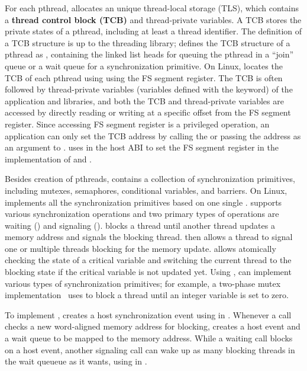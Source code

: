 For each pthread, \libpthread{} allocates an unique thread-local storage (TLS), which contains a {\bf thread control block (TCB)} and thread-private variables.
A TCB stores the private states of a pthread, including at least a thread identifier.
The definition of a TCB structure is up to the threading library;
\libpthread{} defines the TCB structure of a pthread as ,
containing the linked list heads for queuing the pthread
in a ``join'' queue or a wait queue for a synchronization primitive.
On \graphenearch{} Linux, \libpthread{}
locates the TCB of each pthread using using the FS segment register.
The TCB is often
followed by thread-private variables (variables defined with the  keyword) of the application
and libraries,
and both the TCB and thread-private variables
are accessed by directly reading or writing at a specific offset from the FS segment register.
Since accessing FS segment register is a privileged operation,
an application can only set the TCB address
by calling the  \linuxapi{} or passing the address as an argument to .
\thelibos{} uses  in the host ABI
to set the FS segment register
in the implementation of  and .


Besides creation of pthreads, \libpthread{} contains a collection of synchronization primitives,
including mutexes, semaphores, conditional variables, and barriers.
On Linux, \libpthread{} implements all the synchronization primitives based on one single  \linuxapi{}.
 supports various synchronization operations and two primary types of operations are waiting () and signaling ().
blocks a thread until another thread updates a memory address
and signals the blocking thread.
 then allows a thread
to signal one or multiple threads blocking for the memory update.
allows atomically checking the state of a critical variable
and switching the current thread to the blocking state if the critical variable is not updated yet.
Using , \libpthread{} can implement various types of synchronization primitives;
for example, a two-phase mutex implementation~
uses  to block a thread until an integer variable is set to zero.


To implement , \thelibos{} creates a host synchronization event using  in \thehostabi{}.
Whenever a  call checks a new word-aligned memory address for blocking, \thelibos{} creates a host event and a wait queue to be mapped to the memory address.
While a waiting  call blocks on a host event,
another signaling  call can wake up as many blocking threads in the wait queueue as it wants, using  in \thehostabi{}.


